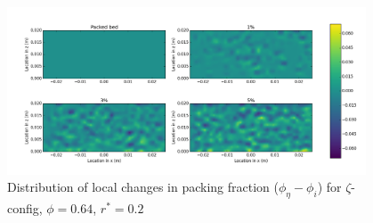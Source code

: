 \begin{figure}[!t]
    \centering
    \includegraphics[width = 0.95\textwidth]{figures/z-64-r125-1-deltas.png}
    \caption{Distribution of local changes in packing fraction ($\phi_{\eta} - \phi_i$) for $\zeta$-config, $\phi = 0.64$, $r^* = 0.2$}\label{fig:z-64-r125-deltas}
\end{figure}


\FloatBarrier



